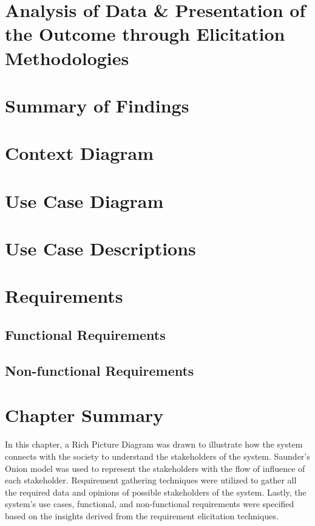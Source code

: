 \section{Analysis of Data \& Presentation of the Outcome through Elicitation Methodologies}


\section{Summary of Findings}

\section{Context Diagram}

\section{Use Case Diagram}

\section{Use Case Descriptions}

\section{Requirements}

\subsection{Functional Requirements}

\subsection{Non-functional Requirements}

\section{Chapter Summary}
In this chapter, a Rich Picture Diagram was drawn to illustrate how the system connects with the society to understand the stakeholders of the system. Saunder's Onion model was used to represent the stakeholders with the flow of influence of each stakeholder. Requirement gathering techniques were utilized to gather all the required data and opinions of possible stakeholders of the system. Lastly, the system's use cases, functional, and non-functional requirements were specified based on the insights derived from the requirement elicitation techniques.
